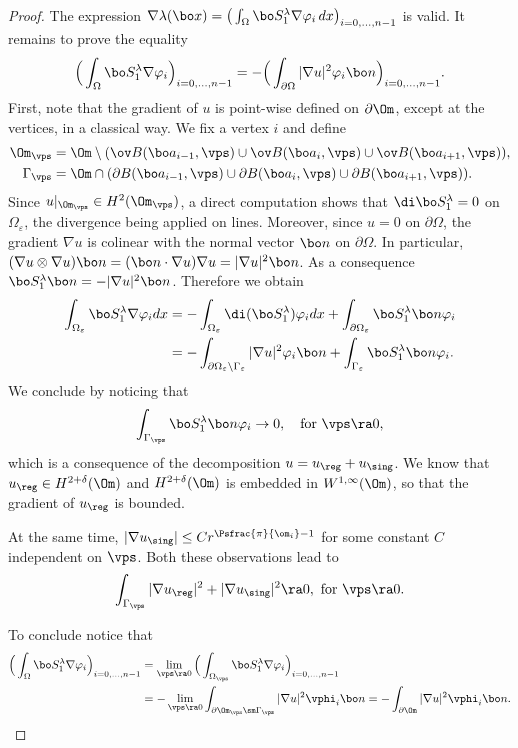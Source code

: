 \begin{proof}
The expression
$\nabla \lambda(\bo x) = \big (\int_\Omega \bo S_1^\lambda \nabla \varphi_i\, dx\big)_{i=0,\dots,n-1}$ is valid. It remains to prove the equality
\[
\Big (\int_\Omega \bo S_1^\lambda \nabla \varphi_i\Big)_{i=0,\dots,n-1}= -\Big (\int_{\partial \Omega} |\nabla u|^2 \varphi_i \bo n\Big)_{i=0,\dots,n-1}.
\]
First, note that the gradient of $u$ is point-wise defined on $\partial \Om$, except at the vertices, in a classical way. We fix a vertex $i$ and define
\begin{align*}
\Om_\vps&= \Om \setminus (\ov B(\bo a_{i-1}, \vps) \cup \ov B(\bo a_{i}, \vps)\cup \ov B(\bo a_{i+1}, \vps)),
\\
\Gamma_\vps&= \Om \cap (\partial B(\bo a_{i-1}, \vps) \cup \partial B(\bo a_{i}, \vps)\cup \partial B(\bo a_{i+1}, \vps)).
\end{align*}
Since $u|_{\Om_
\vps} \in H^2(\Om_\vps)$, a direct computation shows that $\di \bo S_1^\lambda=0$ on $\Omega_\varepsilon$, the divergence being applied on lines. Moreover, since $u=0$ on $\partial \Omega$, the gradient $\nabla u$ is colinear with the normal vector $\bo n$ on $\partial \Omega$. In particular, $(\nabla u \otimes \nabla u) \bo n = (\bo n \cdot \nabla u) \nabla u = |\nabla u |^2 \bo n$. As a consequence $\bo S_1^\lambda \bo n = -|\nabla u|^2 \bo n$. Therefore we obtain
\begin{align*}
\int_{\Omega_\varepsilon} \bo S_1^\lambda \nabla \varphi_i dx &= -\int_{\Omega_\varepsilon} \di (\bo S_1^\lambda) \varphi_i dx +\int_{\partial \Omega_\varepsilon} \bo S_1^\lambda \bo n \varphi_i \\
&= -\int_{\partial \Omega_\varepsilon \setminus \Gamma_\varepsilon} |\nabla u|^2 \varphi_i \bo n + \int_{\Gamma_\varepsilon} \bo S_1^\lambda \bo n \varphi_i.
\end{align*}
We conclude by noticing that
\[
\int_{ \Gamma_\vps} \bo S_1^\lambda \bo n \varphi_i \to 0, \quad\text{for } \vps \ra 0,
\]
which is a consequence of the decomposition $u=u_{\reg}+u_{\sing}$. We know that $u_{\reg} \in H^{2+\delta} (\Om)$ and
$H^{2+\delta} (\Om)$ is embedded in $W^{1, \infty} (\Om)$, so that the gradient of $u_{\reg} $ is bounded.

At the same time, $|\nabla u_{\sing}|\le C r^{\Psfrac{\pi}{\om_i} -1}$ for some constant $C$ independent on $\vps$. Both these observations lead to
\[
\int_{ \Gamma_\vps} |\nabla u_{\reg}|^2 + |\nabla u_{\sing}|^2 \ra 0, \mbox{ for } \vps \ra 0.
\]

To conclude notice that
\begin{align*}
\Big (\int_\Omega \bo S_1^\lambda \nabla \varphi_i\Big)_{i=0,\dots,n-1}&= \lim_{\vps \ra 0} \Big (\int_{\Omega_\vps} \bo S_1^\lambda \nabla \varphi_i\Big)_{i=0,\dots,n-1}\\
&= - \lim_{\vps \ra 0} \int_{\partial \Om_\vps\sm \Gamma_\vps} |\nabla u|^2 \vphi_i \bo n= -\int_{\partial \Om} |\nabla u|^2 \vphi_i\bo n.\qedhere
\end{align*}
\end{proof}

